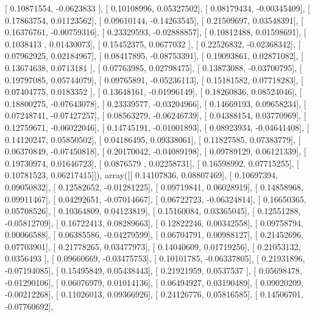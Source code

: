 \documentclass{article}
\begin{document}
       [ 0.10871554, -0.0623833 ],
       [ 0.10108996,  0.05327502],
       [ 0.08179434, -0.00345409],
       [ 0.17863754,  0.01123562],
       [ 0.09610144, -0.14263545],
       [ 0.21509697,  0.03548391],
       [ 0.16376761, -0.00759316],
       [ 0.23329593, -0.02888857],
       [ 0.10812488,  0.01598691],
       [ 0.1038413 ,  0.01430073],
       [ 0.15452375,  0.0677032 ],
       [ 0.22526832, -0.02368342],
       [ 0.07962925,  0.02184967],
       [ 0.08417895, -0.08753391],
       [ 0.19093861,  0.02871082],
       [ 0.13674638,  0.0713181 ],
       [ 0.07763985,  0.02798475],
       [ 0.13873088, -0.03700795],
       [ 0.19797085,  0.05744079],
       [ 0.09765891, -0.05236113],
       [ 0.15181582,  0.07718283],
       [ 0.07404775,  0.0183352 ],
       [ 0.13648161, -0.01996149],
       [ 0.18260836,  0.08524046],
       [ 0.18800275, -0.07643078],
       [ 0.23339577, -0.03204966],
       [ 0.14669193,  0.09658234],
       [ 0.07248741, -0.07427257],
       [ 0.08563279, -0.06246739],
       [ 0.04388154,  0.03770969],
       [ 0.12759671, -0.06022046],
       [ 0.14745191, -0.01001893],
       [ 0.08923934, -0.04641408],
       [ 0.14120247,  0.05850502],
       [ 0.04186495,  0.09338061],
       [ 0.11827585,  0.07383779],
       [ 0.06370849, -0.07450818],
       [ 0.20170042, -0.04089198],
       [ 0.09789129,  0.06121339],
       [ 0.19730974,  0.01646723],
       [ 0.0876579 ,  0.02258731],
       [ 0.16598992,  0.07715255],
       [ 0.10781523,  0.06217415]]), array([[ 0.14107836,  0.08807469],
       [ 0.10697394,  0.09050832],
       [ 0.12582652, -0.01281225],
       [ 0.09719841,  0.06028919],
       [ 0.14858968,  0.09911467],
       [ 0.04292651, -0.07014667],
       [ 0.06722723, -0.06324814],
       [ 0.16650365,  0.05708526],
       [ 0.10364809,  0.04123819],
       [ 0.15160084,  0.03365045],
       [ 0.12551288, -0.05812709],
       [ 0.16722413,  0.08289663],
       [ 0.12822246,  0.00342558],
       [ 0.09758794,  0.00066588],
       [ 0.06385586, -0.04279599],
       [ 0.06704791,  0.00988127],
       [ 0.21452696,  0.07703901],
       [ 0.21778265,  0.03477973],
       [ 0.14040609,  0.01719256],
       [ 0.21053132,  0.0356493 ],
       [ 0.09660669, -0.03475753],
       [ 0.10101785, -0.06337805],
       [ 0.21931896, -0.07194085],
       [ 0.15495849,  0.05438443],
       [ 0.21921959,  0.0537537 ],
       [ 0.05698478, -0.01290106],
       [ 0.06076979,  0.01014136],
       [ 0.06494927,  0.03190489],
       [ 0.09020209, -0.00212268],
       [ 0.11026013,  0.09366926],
       [ 0.24126776,  0.05816585],
       [ 0.14506701, -0.07760692],
\end{document}
